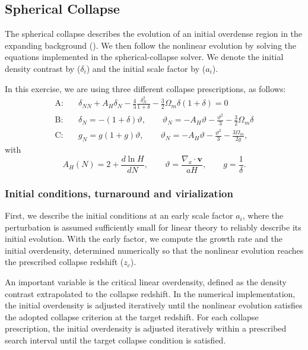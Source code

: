 \subsection{Spherical Collapse}

The spherical collapse describes the evolution of an initial overdense region in the expanding background (\cite{pace2017spherical,Tiago_Batalha_Lecture_9}). We then follow the nonlinear evolution by solving the equations implemented in the spherical-collapse solver. We denote the initial density contrast by ($\delta_i$) and the initial scale factor by ($a_i$).

In this exercise, we are using three different collapse prescriptions, as follows:
    \begin{align}
            \text{A:} & 
            \quad
        \delta_{NN} + A_H \delta_N
        - \frac{4}{3}\frac{\delta_N^2}{1+\delta}
        - \frac{3}{2}\Omega_m\delta(1+\delta) 
        = 0\\
        \text{B:} & 
        \quad
        \delta_N 
        = -(1+\delta)\vartheta,
        \qquad
        \vartheta_N 
        = -A_H\vartheta
        - \frac{\vartheta^2}{3}
        - \frac{3}{2}\Omega_m\delta\\
        \text{C:}& \quad
        g_N 
        = g(1+g)\vartheta,
        \qquad
        \vartheta_N 
        = -A_H\vartheta
        - \frac{\vartheta^2}{3}
        - \frac{3\Omega_m}{2g},
    \end{align}
with
    \begin{equation}
        A_H(N) = 2 + \frac{d\ln H}{dN},
        \qquad
        \vartheta = \frac{\nabla_x \cdot \mathbf{v}}{aH},
        \qquad
        g = \frac{1}{\delta}.
    \end{equation}
    
\subsubsection{Initial conditions, turnaround and virialization}

First, we describe the initial conditions at an early scale factor $a_i$, where the perturbation is assumed sufficiently small for linear theory to reliably describe its initial evolution. With the early factor, we compute the growth rate and the initial overdensity, determined numerically so that the nonlinear evolution reaches the prescribed collapse redshift ($z_c$).

An important variable is the critical linear overdensity, defined as the density contrast extrapolated to the collapse redshift. In the numerical implementation, the initial overdensity is adjusted iteratively until the nonlinear evolution satisfies the adopted collapse criterion at the target redshift. For each collapse prescription, the initial overdensity is adjusted iteratively within a prescribed search interval until the target collapse condition is satisfied.

